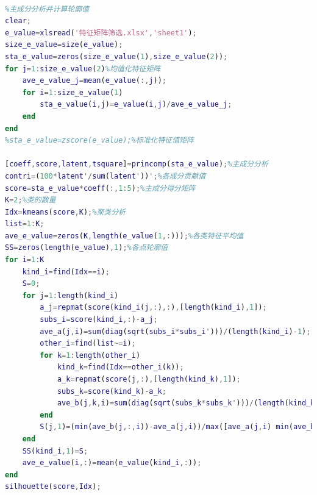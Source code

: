 \documentclass[bwprint]{gmcmthesis}
\begin{document}
\begin{lstlisting}[language=Matlab]%设置不同语言即可。

%主成分分析并计算轮廓值
clear;
e_value=xlsread('特征矩阵筛选.xlsx','sheet1');
size_e_value=size(e_value);
sta_e_value=zeros(size_e_value(1),size_e_value(2));
for j=1:size_e_value(2)%均值化特征矩阵
    ave_e_value_j=mean(e_value(:,j));
    for i=1:size_e_value(1)
        sta_e_value(i,j)=e_value(i,j)/ave_e_value_j;
    end
end
%sta_e_value=zscore(e_value);%标准化特征值矩阵

[coeff,score,latent,tsquare]=princomp(sta_e_value);%主成分分析
contri=(100*latent'/sum(latent'))';%各成分贡献值
score=sta_e_value*coeff(:,1:5);%主成分得分矩阵
K=2;%类的数量
Idx=kmeans(score,K);%聚类分析
list=1:K;
ave_e_value=zeros(K,length(e_value(1,:)));%各类特征平均值
SS=zeros(length(e_value),1);%各点轮廓值
for i=1:K
    kind_i=find(Idx==i);
    S=0;
    for j=1:length(kind_i)
        a_j=repmat(score(kind_i(j,:),:),[length(kind_i),1]);
        subs_i=score(kind_i,:)-a_j;
        ave_a(j,i)=sum(diag(sqrt(subs_i*subs_i')))/(length(kind_i)-1);
        other_i=find(list~=i);
        for k=1:length(other_i)
            kind_k=find(Idx==other_i(k));
            a_k=repmat(score(j,:),[length(kind_k),1]);
            subs_k=score(kind_k)-a_k;
            ave_b(j,k,i)=sum(diag(sqrt(subs_k*subs_k')))/(length(kind_k));
        end
        S(j,1)=(min(ave_b(j,:,i))-ave_a(j,i))/max([ave_a(j,i) min(ave_b(j,:,i))]);
    end
    SS(kind_i,1)=S;
    ave_e_value(i,:)=mean(e_value(kind_i,:));
end
silhouette(score,Idx);
 \end{lstlisting}
\end{document}
